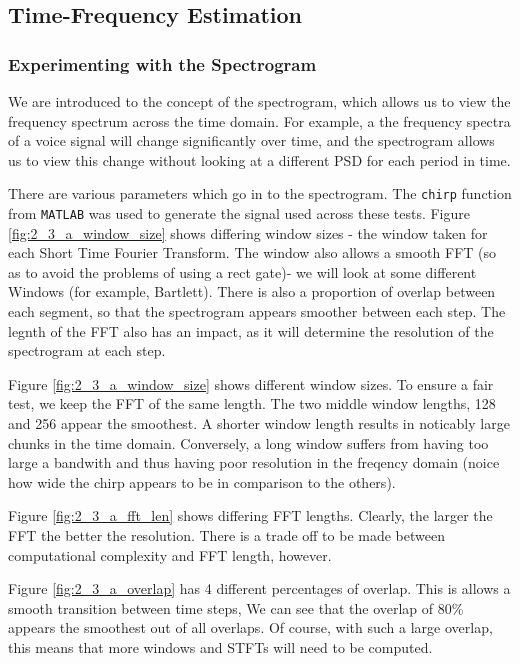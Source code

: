 \documentclass[./main.tex]{subfiles}
\begin{document}
\subsection{Time-Frequency Estimation}

\subsubsection{Experimenting with the Spectrogram}

We are introduced to the concept of the spectrogram, which allows us to view the frequency spectrum across the time domain. For example, a the frequency spectra of a voice signal will change significantly over time, and the spectrogram allows us to view this change without looking at a different PSD for each period in time.

There are various parameters which go in to the spectrogram. The \texttt{chirp} function from \texttt{MATLAB} was used to generate the signal used across these tests. Figure \ref{fig:2_3_a_window_size} shows differing window sizes - the window taken for each Short Time Fourier Transform. The window also allows a smooth FFT (so as to avoid the problems of using a rect gate)- we will look at some different Windows (for example, Bartlett). There is also a proportion of overlap between each segment, so that the spectrogram appears smoother between each step. The legnth of the FFT also has an impact, as it will determine the resolution of the spectrogram at each step.

Figure \ref{fig:2_3_a_window_size} shows different window sizes. To ensure a fair test, we keep the FFT of the same length. The two middle window lengths, 128 and 256 appear the smoothest. A shorter window length results in noticably large chunks in the time domain. Conversely, a long window suffers from having too large a bandwith and thus having poor resolution in the freqency domain (noice how wide the chirp appears to be in comparison to the others).

Figure \ref{fig:2_3_a_fft_len} shows differing FFT lengths. Clearly, the larger the FFT the better the resolution. There is a trade off to be made between computational complexity and FFT length, however.

Figure \ref{fig:2_3_a_overlap} has 4 different percentages of overlap. This is allows a smooth transition between time steps, We can see that the overlap of 80\% appears the smoothest out of all overlaps. Of course, with such a large overlap, this means that more windows and STFTs will need to be computed.
\end{document}
